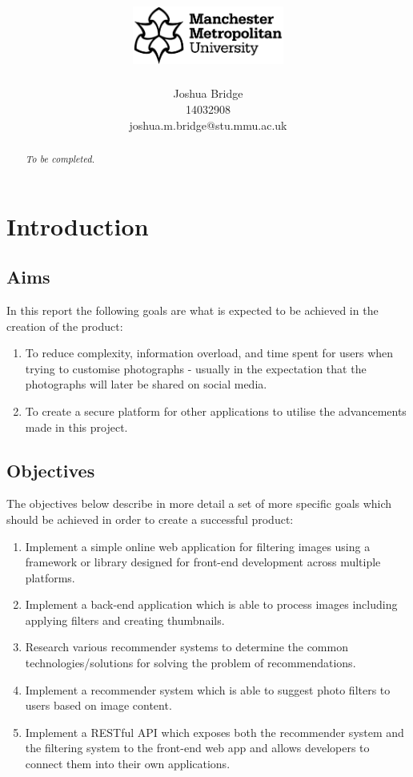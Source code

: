 \documentclass[a4paper,12pt]{report}
\title{\vspace{-2cm}\includegraphics[width=5cm]{mmu-white.pdf}\\\vspace{4cm}\reportTitle\vspace{1cm}}
\author{Joshua Bridge\\14032908\\joshua.m.bridge@stu.mmu.ac.uk}
\begin{document}
\maketitle

\doublespacing

\begin{abstract}
  \textit{To be completed.}
\end{abstract}

\tableofcontents

\listoffigures

\listoftables

\chapter{Introduction}

  \newpage

  \section{Aims}
    In this report the following goals are what is expected to be achieved in the creation of the product:

    \begin{enumerate}
      \item To reduce complexity, information overload, and time spent for users when trying to customise photographs - usually in the expectation that the photographs will later be shared on social media.
      \item To create a secure platform for other applications to utilise the advancements made in this project.
    \end{enumerate}

  \section{Objectives} \label{sec:objectives}
    The objectives below describe in more detail a set of more specific goals which should be achieved in order to create a successful product:

    \begin{enumerate}
      \item \label{obj1}Implement a simple online web application for filtering images using a framework or library designed for front-end development across multiple platforms.
      \item \label{obj2}Implement a back-end application which is able to process images including applying filters and creating thumbnails.
      \item \label{obj3}Research various recommender systems to determine the common technologies/solutions for solving the problem of recommendations.
      \item \label{obj4}Implement a recommender system which is able to suggest photo filters to users based on image content.
      \item \label{obj5}Implement a RESTful API which exposes both the recommender system and the filtering system to the front-end web app and allows developers to connect them into their own applications.
    \end{enumerate}
\end{document}
